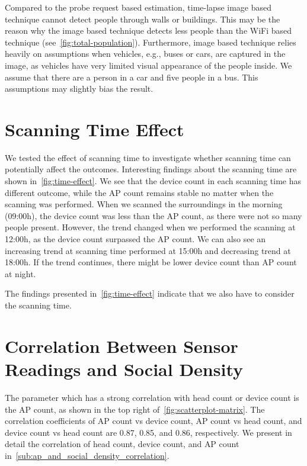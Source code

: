 Compared to the probe request based estimation, time-lapse image based technique cannot detect people through walls or buildings. This may be the reason why the image based technique detects less people than the WiFi based technique (see~\autoref{fig:total-population}). Furthermore, image based technique relies heavily on assumptions when vehicles, e.g., buses or cars, are captured in the image, as vehicles have very limited visual appearance of the people inside. We assume that there are a person in a car and five people in a bus. This assumptions may slightly bias the result.

\section{Scanning Time Effect} %
\label{sec:scanning_time_effect}
We tested the effect of scanning time to investigate whether scanning time can potentially affect the outcomes. Interesting findings about the scanning time are shown in~\autoref{fig:time-effect}. We see that the device count in each scanning time has different outcome, while the \ac{AP} count remains stable no matter when the scanning was performed. When we scanned the surroundings in the morning (09:00h), the device count was less than the \ac{AP} count, as there were not so many people present. However, the trend changed when we performed the scanning at 12:00h, as the device count surpassed the \ac{AP} count. We can also see an increasing trend at scanning time performed at 15:00h and decreasing trend at 18:00h.
If the trend continues, there might be lower device count than \ac{AP} count at night.

The findings presented in~\autoref{fig:time-effect} indicate that we also have to consider the scanning time.

\section{Correlation Between Sensor Readings and Social Density} %
\label{sec:correlation_between_sensor_readings_and_social_density}
The parameter which has a strong correlation with head count or device count is the \ac{AP} count, as shown in the top right of~\autoref{fig:scatterplot-matrix}. The correlation coefficients of \ac{AP} count vs device count, \ac{AP} count vs head count, and device count vs head count are 0.87, 0.85, and 0.86, respectively. We present in detail the correlation of head count, device count, and \ac{AP} count in~\autoref{sub:ap_and_social_density_correlation}.


